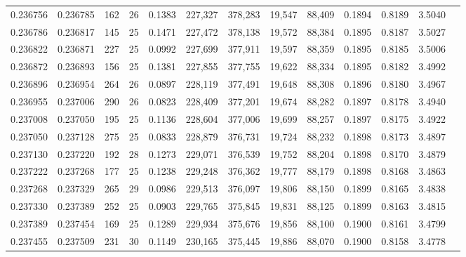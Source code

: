 \begin{tabular}{rrrrrrrrrrrrr}
0.236756 & 0.236785 &   162 &  26 &                                     0.1383 & 227,327 & 378,283 &  19,547 &  88,409 & 0.1894 & 0.8189 & 3.5040 \\
0.236786 & 0.236817 &   145 &  25 &                                     0.1471 & 227,472 & 378,138 &  19,572 &  88,384 & 0.1895 & 0.8187 & 3.5027 \\
0.236822 & 0.236871 &   227 &  25 &                                     0.0992 & 227,699 & 377,911 &  19,597 &  88,359 & 0.1895 & 0.8185 & 3.5006 \\
0.236872 & 0.236893 &   156 &  25 &                                     0.1381 & 227,855 & 377,755 &  19,622 &  88,334 & 0.1895 & 0.8182 & 3.4992 \\
0.236896 & 0.236954 &   264 &  26 &                                     0.0897 & 228,119 & 377,491 &  19,648 &  88,308 & 0.1896 & 0.8180 & 3.4967 \\
0.236955 & 0.237006 &   290 &  26 &                                     0.0823 & 228,409 & 377,201 &  19,674 &  88,282 & 0.1897 & 0.8178 & 3.4940 \\
0.237008 & 0.237050 &   195 &  25 &                                     0.1136 & 228,604 & 377,006 &  19,699 &  88,257 & 0.1897 & 0.8175 & 3.4922 \\
0.237050 & 0.237128 &   275 &  25 &                                     0.0833 & 228,879 & 376,731 &  19,724 &  88,232 & 0.1898 & 0.8173 & 3.4897 \\
0.237130 & 0.237220 &   192 &  28 &                                     0.1273 & 229,071 & 376,539 &  19,752 &  88,204 & 0.1898 & 0.8170 & 3.4879 \\
0.237222 & 0.237268 &   177 &  25 &                                     0.1238 & 229,248 & 376,362 &  19,777 &  88,179 & 0.1898 & 0.8168 & 3.4863 \\
0.237268 & 0.237329 &   265 &  29 &                                     0.0986 & 229,513 & 376,097 &  19,806 &  88,150 & 0.1899 & 0.8165 & 3.4838 \\
0.237330 & 0.237389 &   252 &  25 &                                     0.0903 & 229,765 & 375,845 &  19,831 &  88,125 & 0.1899 & 0.8163 & 3.4815 \\
0.237389 & 0.237454 &   169 &  25 &                                     0.1289 & 229,934 & 375,676 &  19,856 &  88,100 & 0.1900 & 0.8161 & 3.4799 \\
0.237455 & 0.237509 &   231 &  30 &                                     0.1149 & 230,165 & 375,445 &  19,886 &  88,070 & 0.1900 & 0.8158 & 3.4778 \\

\end{tabular}
